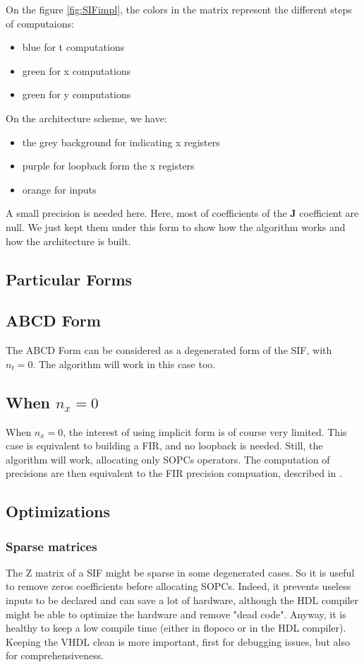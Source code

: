 	On the figure \ref{fig:SIFimpl}, the colors in the matrix represent the different steps of computaions:
	\begin{itemize}
		\item blue for t computations
		\item green for x computations
		\item green for y computations
	\end{itemize}

	On the architecture scheme, we have:
	\begin{itemize}
		\item the grey background for indicating x registers
		\item purple for loopback form the x registers
		\item orange for inputs
	\end{itemize}
	
	A small precision is needed here.
	Here, most of coefficients of the $\boldsymbol{J}$ coefficient are null.
	We just kept them under this form to show how the algorithm works and how the architecture is built.
	

\subsection{Particular Forms}
	\subsection{ABCD Form}
	The ABCD Form can be considered as a degenerated form of the SIF, with $n_t=0$.
	The algorithm will work in this case too.
	\subsection{When $n_x=0$}
	When $n_x=0$, the interest of using implicit form is of course very limited.
	This case is equivalent to building a FIR, and no loopback is needed.
	Still, the algorithm will work, allocating only SOPCs operators.
	The computation of precisions are then equivalent to the FIR precision compuation, described in \cite{}.
	
\subsection{Optimizations}
	\subsubsection{Sparse matrices}
		The Z matrix of a SIF might be sparse in some degenerated cases.
		So it is useful to remove zeros coefficients before allocating SOPCs.
		Indeed, it prevents useless inputs to be declared and can save a lot of hardware,
		although the HDL compiler might be able to optimize the hardware and remove "dead code".
		Anyway, it is healthy to keep a low compile time (either in flopoco or in the HDL compiler).
		Keeping the VHDL clean is more important, first for debugging issues, but also for comprehensiveness.
